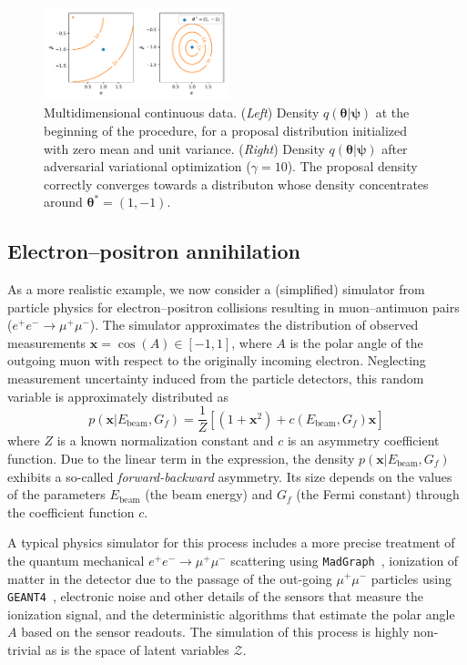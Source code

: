 \documentclass[twocolumn,superscriptaddress,aps]{revtex4-1}
\newcommand{\bftheta}{{\bm \theta}}
\newcommand{\bfpsi}{{\bm \psi}}
\theoremstyle{plain}
\begin{document}
\begin{figure}
    \centering
    \includegraphics[width=0.48\textwidth]{figures/multi.pdf}
    \caption{Multidimensional continuous data.
             ({\it Left}) Density $q(\bftheta|\bfpsi)$ at the beginning of the procedure, for a proposal distribution initialized with zero mean and unit variance.
             ({\it Right}) Density $q(\bftheta|\bfpsi)$ after adversarial variational optimization ($\gamma=10$). The proposal density correctly converges towards a distributon whose density concentrates around $\bftheta^* = (1, -1)$.
             }\label{fig:multi}
\end{figure}


\subsection{Electron--positron annihilation}

As a more realistic example, we now consider a (simplified) simulator from
particle physics for electron--positron collisions resulting in muon--antimuon
pairs ($e^+e^- \rightarrow \mu^+\mu^-$). The simulator approximates the
distribution of observed measurements $\mathbf{x} = \cos(A) \in [-1,1]$, where $A$ is the
polar angle of the outgoing muon with respect  to the originally incoming
electron. Neglecting measurement uncertainty induced from the particle detectors, 
this random variable is approximately distributed as
\begin{equation}\label{eq:simple_weinberg}
    p(\mathbf{x}|E_\text{beam}, G_f) = \frac{1}{Z} \left[ (1 + \mathbf{x}^2) + c(E_\text{beam}, G_f) \mathbf{x} \right]
\end{equation}
where $Z$ is a known normalization constant and $c$ is an asymmetry coefficient
function. Due to the linear term in the expression, the density $p(\mathbf{x} |
E_\text{beam}, G_f)$ exhibits a so-called {\it forward-backward} asymmetry.  Its
size depends on the values of the parameters $E_\text{beam}$ (the beam energy)
and $G_f$ (the Fermi constant) through the coefficient function $c$. 

A typical physics simulator for this process includes a more precise treatment of the 
quantum mechanical  $e^+e^- \rightarrow \mu^+\mu^-$ scattering 
using \texttt{MadGraph}~\citep{Alwall:2011uj},  ionization of matter in the 
detector due to the passage of the out-going $\mu^+\mu^-$ particles using 
\texttt{GEANT4}~\citep{Agostinelli:2002hh}, electronic noise and other details of the sensors 
that measure the ionization signal, and the deterministic algorithms that 
estimate the polar angle $A$ based on the sensor readouts. The simulation of 
this process is highly non-trivial as is the space of latent variables $\mathcal{Z}$.
\end{document}
